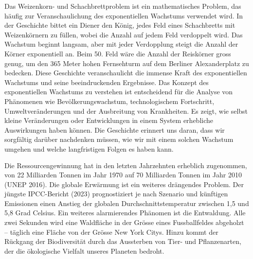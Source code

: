 \documentclass[
  nswissgerman,
  a4paper,
  openany]{book}
\begin{document}
\begin{tcolorbox}[enhanced jigsaw, arc=.35mm, bottomrule=.15mm, bottomtitle=1mm, breakable, colback=white, colbacktitle=quarto-callout-tip-color!10!white, colframe=quarto-callout-tip-color-frame, coltitle=black, left=2mm, leftrule=.75mm, opacityback=0, opacitybacktitle=0.6, rightrule=.15mm, title={Das Weizenkorn- und Schachbrettproblem: eine Illustration des
exponentiellen Wachstums}, titlerule=0mm, toprule=.15mm, toptitle=1mm]

Das Weizenkorn- und Schachbrettproblem ist ein mathematisches Problem,
das häufig zur Veranschaulichung des exponentiellen Wachstums verwendet
wird. In der Geschichte bittet ein Diener den König, jedes Feld eines
Schachbretts mit Weizenkörnern zu füllen, wobei die Anzahl auf jedem
Feld verdoppelt wird. Das Wachstum beginnt langsam, aber mit jeder
Verdopplung steigt die Anzahl der Körner exponentiell an. Beim 50. Feld
wäre die Anzahl der Reiskörner gross genug, um den 365 Meter hohen
Fernsehturm auf dem Berliner Alexanderplatz zu bedecken. Diese
Geschichte veranschaulicht die immense Kraft des exponentiellen
Wachstums und seine beeindruckenden Ergebnisse. Das Konzept des
exponentiellen Wachstums zu verstehen ist entscheidend für die Analyse
von Phänomenen wie Bevölkerungswachstum, technologischem Fortschritt,
Umweltveränderungen und der Ausbreitung von Krankheiten. Es zeigt, wie
selbst kleine Veränderungen oder Entwicklungen in einem System
erhebliche Auswirkungen haben können. Die Geschichte erinnert uns daran,
dass wir sorgfältig darüber nachdenken müssen, wie wir mit einem solchen
Wachstum umgehen und welche langfristigen Folgen es haben kann.

\end{tcolorbox}

Die Ressourcengewinnung hat in den letzten Jahrzehnten erheblich
zugenommen, von 22 Milliarden Tonnen im Jahr 1970 auf 70 Milliarden
Tonnen im Jahr 2010 (UNEP 2016). Die globale Erwärmung ist ein weiteres
drängendes Problem. Der jüngste IPCC-Bericht (2023) prognostiziert je
nach Szenario und künftigen Emissionen einen Anstieg der globalen
Durchschnittstemperatur zwischen 1,5 und 5,8 Grad Celsius. Ein weiteres
alarmierendes Phänomen ist die Entwaldung. Alle zwei Sekunden wird eine
Waldfläche in der Grösse eines Fussballfeldes abgeholzt -- täglich eine
Fläche von der Grösse New York Citys. Hinzu kommt der Rückgang der
Biodiversität durch das Aussterben von Tier- und Pflanzenarten, der die
ökologische Vielfalt unseres Planeten bedroht.
\end{document}
